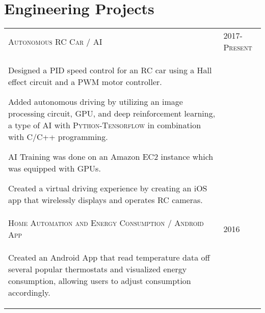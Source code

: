 \documentclass[a4paper,10pt]{article}
\begin{document}
\section{Engineering Projects}
\begin{supertabular}{p{13.9cm}>{\raggedleft\arraybackslash}p{3.4cm}}
	\textsc{Autonomous RC Car / AI}
	& \textsc{2017-Present} \\
	\begin{enumerate*}[label =$\circ$,itemjoin={\newline}]
		\item \footnotesize Designed a PID speed control for an RC car using a Hall effect circuit and a PWM motor controller.
    \item \footnotesize Added autonomous driving by utilizing an image processing circuit, GPU, and deep reinforcement learning, a type of AI with \textsc{Python-Tensorflow} in combination with \textsc{C/C++} programming.
    \item \footnotesize AI Training was done on an Amazon EC2 instance which was equipped with GPUs.
    \item \footnotesize Created a virtual driving experience by creating an iOS app that wirelessly displays and operates RC cameras.
	\end{enumerate*} \vspace{2mm} & \\

  \textsc{Home Automation and Energy Consumption / Android App}
  & \textsc{2016} \\
  \begin{enumerate*}[label =$\circ$,itemjoin={\newline}]
    \item \footnotesize Created an Android App that read temperature data off several popular thermostats and visualized energy consumption, allowing users to adjust consumption accordingly.
  \end{enumerate*} & \\

\end{supertabular}


\end{document}
